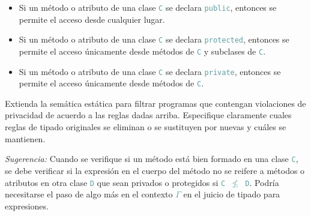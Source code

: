 \documentclass{article}
\newcommand{\tx}[1]{\textcolor{CadetBlue} {\texttt{#1}}}
\newcommand{\ti}[1]{\textcolor{RoyalPurple} {\textit{#1}}}
\begin{document}
\begin{enumerate}
        \begin{itemize}
            \item Si un método o atributo de una clase \tx{C} se declara 
            \tx{public}, entonces se permite el acceso desde cualquier lugar.

            \item Si un método o atributo de una clase \tx{C} se declara 
            \tx{protected}, entonces se permite el acceso únicamente desde
            métodos de \tx{C} y subclases de \tx{C}.

            \item Si un método o atributo de una clase \tx{C} se declara 
            \tx{private}, entonces se permite el acceso únicamente desde
            métodos de \tx{C}.
        \end{itemize}

        Extienda la semática estática para filtrar programas que contengan 
        violaciones de privacidad de acuerdo a las reglas dadas arriba. 
        Especifique claramente cuales reglas de tipado originales se eliminan o 
        se sustituyen por nuevas y cuáles se mantienen.

        \ti{Sugerencia:} Cuando se verifique si un método está bien formado en 
        una clase \tx{C}, se debe verificar si la expresión en el cuerpo del 
        método no se reifere a métodos o atributos en otra clase \tx{D} que sean
        privados o protegidos si \tx{C $\not \leq$ D}. Podría necesitarse el 
        paso de algo más en el contexto \tx{$\Gamma$} en el juicio de tipado 
        para expresiones.

    \end{enumerate}
\end{document}
